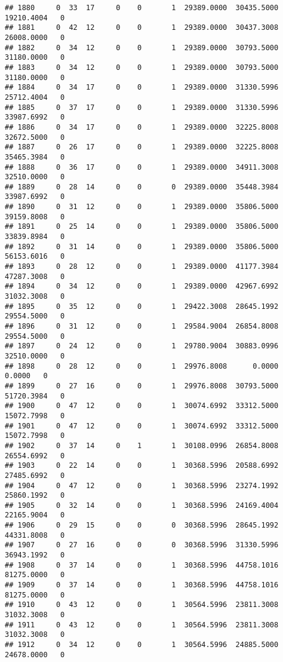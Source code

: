 \documentclass[
]{article}
\begin{document}
\begin{enumerate}
\begin{verbatim}
## 1880     0  33  17     0    0       1  29389.0000  30435.5000  19210.4004   0
## 1881     0  42  12     0    0       1  29389.0000  30437.3008  26008.0000   0
## 1882     0  34  12     0    0       1  29389.0000  30793.5000  31180.0000   0
## 1883     0  34  12     0    0       1  29389.0000  30793.5000  31180.0000   0
## 1884     0  34  17     0    0       1  29389.0000  31330.5996  25712.4004   0
## 1885     0  37  17     0    0       1  29389.0000  31330.5996  33987.6992   0
## 1886     0  34  17     0    0       1  29389.0000  32225.8008  32672.5000   0
## 1887     0  26  17     0    0       1  29389.0000  32225.8008  35465.3984   0
## 1888     0  36  17     0    0       1  29389.0000  34911.3008  32510.0000   0
## 1889     0  28  14     0    0       0  29389.0000  35448.3984  33987.6992   0
## 1890     0  31  12     0    0       1  29389.0000  35806.5000  39159.8008   0
## 1891     0  25  14     0    0       1  29389.0000  35806.5000  33839.8984   0
## 1892     0  31  14     0    0       1  29389.0000  35806.5000  56153.6016   0
## 1893     0  28  12     0    0       1  29389.0000  41177.3984  47287.3008   0
## 1894     0  34  12     0    0       1  29389.0000  42967.6992  31032.3008   0
## 1895     0  35  12     0    0       1  29422.3008  28645.1992  29554.5000   0
## 1896     0  31  12     0    0       1  29584.9004  26854.8008  29554.5000   0
## 1897     0  24  12     0    0       1  29780.9004  30883.0996  32510.0000   0
## 1898     0  28  12     0    0       1  29976.8008      0.0000      0.0000   0
## 1899     0  27  16     0    0       1  29976.8008  30793.5000  51720.3984   0
## 1900     0  47  12     0    0       1  30074.6992  33312.5000  15072.7998   0
## 1901     0  47  12     0    0       1  30074.6992  33312.5000  15072.7998   0
## 1902     0  37  14     0    1       1  30108.0996  26854.8008  26554.6992   0
## 1903     0  22  14     0    0       1  30368.5996  20588.6992  27485.6992   0
## 1904     0  47  12     0    0       1  30368.5996  23274.1992  25860.1992   0
## 1905     0  32  14     0    0       1  30368.5996  24169.4004  22165.9004   0
## 1906     0  29  15     0    0       0  30368.5996  28645.1992  44331.8008   0
## 1907     0  27  16     0    0       0  30368.5996  31330.5996  36943.1992   0
## 1908     0  37  14     0    0       1  30368.5996  44758.1016  81275.0000   0
## 1909     0  37  14     0    0       1  30368.5996  44758.1016  81275.0000   0
## 1910     0  43  12     0    0       1  30564.5996  23811.3008  31032.3008   0
## 1911     0  43  12     0    0       1  30564.5996  23811.3008  31032.3008   0
## 1912     0  34  12     0    0       1  30564.5996  24885.5000  24678.0000   0

\end{verbatim}
\end{enumerate}
\end{document}
